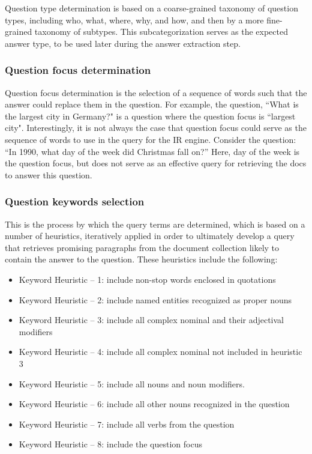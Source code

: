 Question type determination is based on a coarse-grained taxonomy of question types, including who, what, where, why, and how, and then by a more fine-grained taxonomy of subtypes.  This subcategorization serves as the expected answer type, to be used later during the answer extraction step.

\subsubsection{Question focus determination}

Question focus determination is the selection of a sequence of words such that the answer could replace them in the question.  For example, the question, ``What is the largest city in Germany?" is a question where the question focus is ``largest city".  Interestingly, it is not always the case that question focus could serve as the sequence of words to use in the query for the IR engine.   Consider the question: ``In 1990, what day of the week did Christmas fall on?”  Here, day of the week is the question focus, but does not serve as an effective query for retrieving the docs to answer this question.  

\subsubsection{Question keywords selection}

This is the process by which the query terms are determined, which is based on a number of heuristics, iteratively applied in order to ultimately develop a query that retrieves promising paragraphs from the document collection likely to contain the answer to the question.  These heuristics include the following:

\begin{itemize}
\item Keyword Heuristic – 1: include non-stop words enclosed in quotations 
\item Keyword Heuristic – 2: include named entities recognized as proper nouns 
\item Keyword Heuristic – 3: include all complex nominal and their adjectival modifiers
\item Keyword Heuristic – 4: include all complex nominal not included in heuristic 3 
\item Keyword Heuristic – 5: include all nouns and noun modifiers.
\item Keyword Heuristic – 6: include all other nouns recognized in the question 
\item Keyword Heuristic – 7: include all verbs from the question
\item Keyword Heuristic – 8: include the question focus 
\end{itemize}

